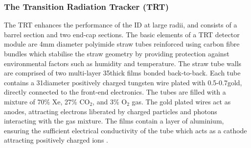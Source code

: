 \subsubsection{The Transition Radiation Tracker (TRT)}
The TRT enhances the performance of the ID at large radii, and consists of a barrel section and two end-cap sections. The basic elements of a TRT detector module are 4mm diameter polyimide straw tubes reinforced using carbon fibre bundles which stabilise the straw geometry by providing protection against environmental factors such as humidity and temperature. The straw tube walls are comprised of two multi-layer 35\microns thick films bonded back-to-back. Each tube contains a 31\microns diameter positively charged tungsten wire plated with 0.5-0.7\microns gold, directly connected to the front-end electronics. The tubes are filled with a mixture of 70\% Xe, 27\% C$\mathrm{O}_2$, and 3\% $\mathrm{O}_2$ gas. The gold plated wires act as anodes, attracting electrons liberated by charged particles and photons interacting with the gas mixture. The films contain a layer of aluminium, ensuring the sufficient electrical conductivity of the tube which acts as a cathode attracting positively charged ions \cite{Atlas:trt_designreport}.%
